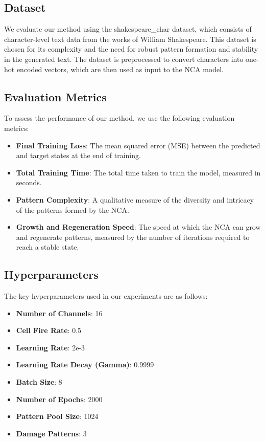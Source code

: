 \documentclass{article} %
\begin{document}
\subsection{Dataset}
We evaluate our method using the shakespeare\_char dataset, which consists of character-level text data from the works of William Shakespeare. This dataset is chosen for its complexity and the need for robust pattern formation and stability in the generated text. The dataset is preprocessed to convert characters into one-hot encoded vectors, which are then used as input to the NCA model.

\subsection{Evaluation Metrics}
To assess the performance of our method, we use the following evaluation metrics:
\begin{itemize}
    \item \textbf{Final Training Loss}: The mean squared error (MSE) between the predicted and target states at the end of training.
    \item \textbf{Total Training Time}: The total time taken to train the model, measured in seconds.
    \item \textbf{Pattern Complexity}: A qualitative measure of the diversity and intricacy of the patterns formed by the NCA.
    \item \textbf{Growth and Regeneration Speed}: The speed at which the NCA can grow and regenerate patterns, measured by the number of iterations required to reach a stable state.
\end{itemize}

\subsection{Hyperparameters}
The key hyperparameters used in our experiments are as follows:
\begin{itemize}
    \item \textbf{Number of Channels}: 16
    \item \textbf{Cell Fire Rate}: 0.5
    \item \textbf{Learning Rate}: 2e-3
    \item \textbf{Learning Rate Decay (Gamma)}: 0.9999
    \item \textbf{Batch Size}: 8
    \item \textbf{Number of Epochs}: 2000
    \item \textbf{Pattern Pool Size}: 1024
    \item \textbf{Damage Patterns}: 3
\end{itemize}
\end{document}
